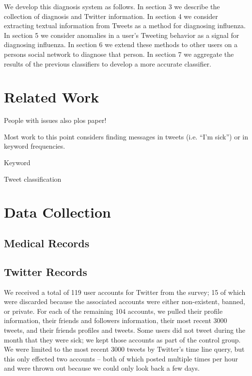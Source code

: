 \documentclass{acm_proc_article-sp}
\begin{document}
%
%

We develop this diagnosis system as follows. In section 3 we describe the collection of diagnosis and Twitter information. In section 4 we consider extracting textual information from Tweets as a method for diagnosing influenza. In section 5 we consider anomalies in a user's Tweeting behavior as a signal for diagnosing influenza. In section 6 we extend these methods to other users on a persons social network to diagnose that person. In section 7 we aggregate the results of the previous classifiers to develop a more accurate classifier.
\section{Related Work}

People with issues \cite{Bodnar:2013we,Butler:2013uh,Lamb:2013to} also plos paper!

Most work to this point considers finding messages in tweets (i.e. ``I'm sick'') or in keyword frequencies. 

Keyword \cite{Culotta:2010hx,Goel:2010jf}

Tweet classification \cite{Culotta:2010hx,Lamb:2013to,Salathe:2011gr}

\section{Data Collection}
\subsection{Medical Records}
\subsection{Twitter Records}
We received a total of 119 user accounts for Twitter from the survey; 15 of which were discarded because the associated accounts were either non-existent, banned, or private. For each of the remaining 104 accounts, we pulled their profile information, their friends and followers information, their most recent 3000 tweets, and their friends profiles and tweets. Some users did not tweet during the month that they were sick; we kept those accounts as part of the control group. We were limited to the most recent 3000 tweets by Twitter's time line query, but this only effected two accounts -- both of which posted multiple times per hour and were thrown out because we could only look back a few days.
\end{document}
